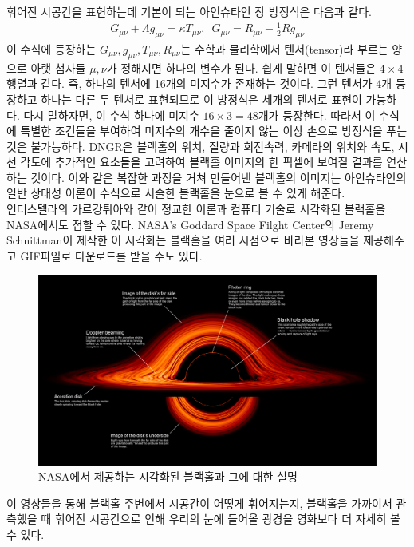 \documentclass[
    aps,
    reprint,
    superscriptaddress,
    ]{revtex4-2}
\begin{document}
휘어진 시공간을 표현하는데 기본이 되는 아인슈타인 장 방정식은 다음과 같다.
\begin{align}
  G_{\mu\nu} + \Lambda g_{\mu\nu} = \kappa T_{\mu\nu},\,\,\,
  G_{\mu\nu} = R_{\mu\nu} -\frac{1}{2}Rg_{\mu\nu}
\end{align}
이 수식에 등장하는 $G_{\mu\nu},g_{\mu\nu},T_{\mu\nu},R_{\mu\nu}$는 수학과 물리학에서 
텐서(tensor)라 부르는 양으로 아랫 첨자들 $\mu, \nu$가 정해지면 하나의 변수가 된다. 쉽게 말하면
이 텐서들은 $4\times 4$ 행렬과 같다. 즉, 하나의 텐서에 16개의 미지수가 존재하는 것이다.
그런 텐서가 4개 등장하고 하나는 다른 두 텐서로 표현되므로 이 방정식은 세개의 텐서로 표현이 가능하다.
다시 말하자면, 이 수식 하나에 미지수 $16\times 3 = 48$개가 등장한다. 따라서 이 수식에 특별한 
조건들을 부여하여 미지수의 개수을 줄이지 않는 이상 손으로 방정식을 푸는 것은 불가능하다. 
DNGR은 블랙홀의 위치, 질량과 회전속력, 카메라의 위치와 속도, 시선 각도에 추가적인 요소들을
고려하여 블랙홀 이미지의 한 픽셀에 보여질 결과를 연산하는 것이다. 이와 같은 복잡한 과정을 거쳐
만들어낸 블랙홀의 이미지는 아인슈타인의 일반 상대성 이론이 수식으로 서술한 블랙홀을 눈으로
볼 수 있게 해준다. \\
인터스텔라의 가르강튀아와 같이 정교한 이론과 컴퓨터 기술로 시각화된 블랙홀을 NASA에서도 접할 수 
있다. NASA's Goddard Space Filght Center의 Jeremy Schnittman이 제작한 이 시각화는 
블랙홀을 여러 시점으로 바라본 영상들을 제공해주고 GIF파일로 다운로드를 받을 수도 있다.
\begin{figure}[htp]
  \includegraphics[scale=0.08]{nasa.jpg}
  \caption{NASA에서 제공하는 시각화된 블랙홀과 그에 대한 설명}
  \label{fig:6}
\end{figure}
이 영상들을 통해 블랙홀 주변에서 시공간이 어떻게 휘어지는지, 블랙홀을 가까이서 관측했을 때 
휘어진 시공간으로 인해 우리의 눈에 들어올 광경을 영화보다 더 자세히 볼 수 있다.
\nocite{*}





\end{document}

